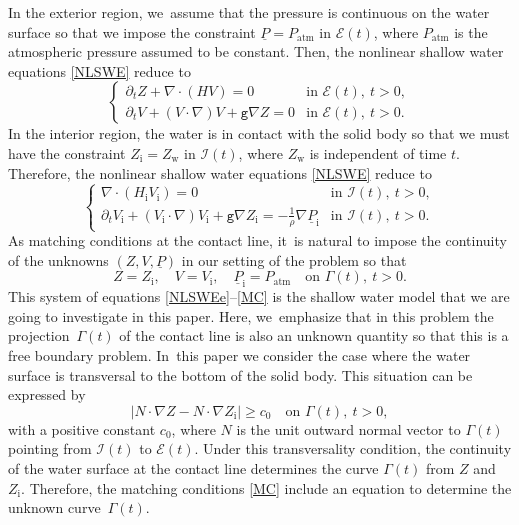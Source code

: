 \documentclass[11pt]{article}
\newcommand{\gr}{{\mathtt g}}
\newcommand{\dt}{\partial_t}
\newcommand{\cI}{{\mathcal I}}
\newcommand{\cE}{{\mathcal E}}
\newcommand{\ul}[1]{\underline{#1}}
\newcommand{\itGamma}{\mathit{\Gamma}}
\theoremstyle{definition}
\begin{document}
In the exterior region, we~assume that the pressure is continuous on the water surface so that we impose the constraint $\ul{P}=P_\mathrm{atm}$ in $\cE(t)$,
where $P_\mathrm{atm}$ is the atmospheric pressure assumed to be constant.
Then, the nonlinear shallow water equations \eqref{NLSWE} reduce to
\begin{equation}\label{NLSWEe}
\begin{cases}
\dt Z+\nabla\cdot(HV) = 0 &\text{in } \cE(t), \ t>0, \\
\dt V+(V\cdot\nabla)V+\gr\nabla Z = 0 &\text{in } \cE(t), \ t>0.
\end{cases}
\end{equation}
In the interior region, the water is in contact with the solid body so that we must have the constraint $Z_\mathrm{i}=Z_\mathrm{w}$ in $\cI(t)$,
where $Z_\mathrm{w}$ is independent of time $t$.
Therefore, the nonlinear shallow water equations \eqref{NLSWE} reduce to
\begin{equation}\label{NLSWEi}
\begin{cases}
\nabla\cdot(H_\mathrm{i}V_\mathrm{i}) = 0 &\text{in } \cI(t), \ t>0, \\
\dt V_\mathrm{i}+(V_\mathrm{i}\cdot\nabla)V_\mathrm{i}+\gr\nabla Z_\mathrm{i} = -\frac{1}{\rho}\nabla\ul{P}_\mathrm{i} &\text{in } \cI(t), \ t>0.
\end{cases}
\end{equation}
As matching conditions at the contact line, it~is natural to impose the continuity of the unknowns $(Z,V,\ul{P})$ in our setting of the problem so that
\begin{equation}\label{MC}
Z=Z_\mathrm{i}, \quad V=V_\mathrm{i}, \quad \ul{P}_\mathrm{i}=P_\mathrm{atm} \quad\text{on } \itGamma(t), \ t>0.
\end{equation}
This system of equations \eqref{NLSWEe}--\eqref{MC} is the shallow water model that we are going to investigate in this paper.
Here, we~emphasize that in this problem the projection~$\itGamma(t)$ of the contact line is also an unknown quantity so that this is a free boundary problem. In~this paper we consider the case where the water surface is transversal to the bottom of the solid body.
This situation can be expressed by
\begin{equation}\label{TransCond}
|N\cdot\nabla Z-N\cdot\nabla Z_\mathrm{i}| \geq c_0 \quad\text{on } \itGamma(t), \ t>0,
\end{equation}
with a positive constant $c_0$, where $N$ is the unit outward normal vector to $\itGamma(t)$ pointing from $\cI(t)$ to $\cE(t)$.
Under this transversality condition, the continuity of the water surface at the contact line determines the curve $\itGamma(t)$ from $Z$ and $Z_\mathrm{i}$.
Therefore, the matching conditions \eqref{MC} include an equation to determine the unknown curve~$\itGamma(t)$.
\end{document}
